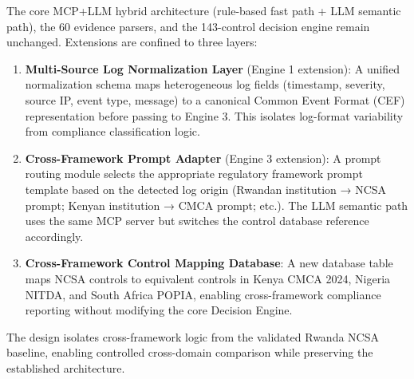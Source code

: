 \documentclass[12pt]{article}
\begin{document}
The core MCP+LLM hybrid architecture (rule-based fast path + LLM semantic path), the 60 evidence parsers, and the 143-control decision engine remain unchanged. Extensions are confined to three layers:

\begin{enumerate}
    \item \textbf{Multi-Source Log Normalization Layer} (Engine 1 extension): A unified normalization schema maps heterogeneous log fields (timestamp, severity, source IP, event type, message) to a canonical Common Event Format (CEF) representation before passing to Engine 3. This isolates log-format variability from compliance classification logic.

    \item \textbf{Cross-Framework Prompt Adapter} (Engine 3 extension): A prompt routing module selects the appropriate regulatory framework prompt template based on the detected log origin (Rwandan institution → NCSA prompt; Kenyan institution → CMCA prompt; etc.). The LLM semantic path uses the same MCP server but switches the control database reference accordingly.

    \item \textbf{Cross-Framework Control Mapping Database}: A new database table maps NCSA controls to equivalent controls in Kenya CMCA 2024, Nigeria NITDA, and South Africa POPIA, enabling cross-framework compliance reporting without modifying the core Decision Engine.
\end{enumerate}

The design isolates cross-framework logic from the validated Rwanda NCSA baseline, enabling controlled cross-domain comparison while preserving the established architecture.

\bigskip
\end{document}

